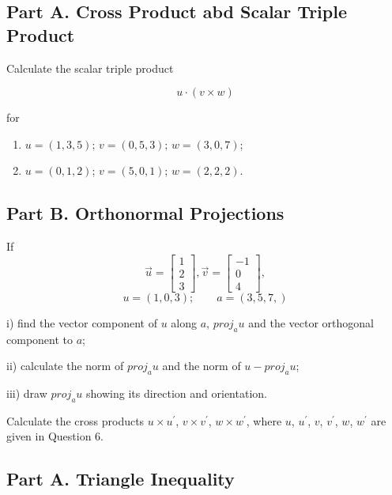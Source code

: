 \documentclass[12pt,a4paper]{article}
\begin{document}
	
	\subsection*{Part A. Cross Product abd Scalar Triple Product}
 Calculate the scalar triple product
	
	\[u\cdot (v\times w)\]
	
	for
	
	\begin{enumerate}
		\item $u=(1,3,5)$; $v=(0,5,3)$; $w=(3,0,7)$;
		
		\item $u=(0,1,2)$; $v=(5,0,1)$; $w=(2,2,2).$
	\end{enumerate}

\subsection*{Part B. Orthonormal Projections}
%	
 If
 	\begin{equation*}
 	\vec{u}=\left[ \begin{array}{c} 1 \\ 2 \\ 3 \end{array}\right],
 	\vec{v}=\left[ \begin{array}{c} -1 \\ 0 \\ 4 \end{array}\right],
 	\end{equation*}
 \[u=(1,0,3);\qquad a=(3,5,7,)\]
 
 i) find the vector component of $u$ along $a$, $proj_{a}u$ and the
 vector orthogonal component to $a$;
 
 ii) calculate the norm of $proj_a u$ and the norm of $u-proj_a u$;
 
 iii) draw $proj_a u$ showing its direction and orientation.
 
 \vspace{0.25cm}Calculate the cross products $u\times
 u^{\prime}$, $v\times v^{\prime}$, $w\times w^{\prime}$, where
 $u$, $u^{\prime}$, $v$, $v^{\prime}$, $w$, $w^{\prime}$ are given
 in  Question $6$.
 	
\subsection*{Part A. Triangle Inequality}
\end{document}

